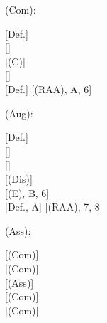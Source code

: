 \documentclass[a4paper,english,fleqn,11pt,final]{scrartcl}
\newcommand{\negg}{{\sim}}
\newcommand{\limp}{\multimap}
\newcommand{\timp}{\rightarrowtriangle}
\newcommand{\tens}{\otimes}
\newcommand{\Deriv}[1]{{\normalfont\textsf{#1}}}
\newcommand{\oland}{\owedge}
\theoremstyle{plain}
\theoremstyle{definition}
\begin{document}
{
\scriptsize



\begin{minipage}[t][][b]{.43\textwidth}
\Deriv{(Com)}:

\medskip

{
\setlength{\fitchprfwidth}{1.2in}
\fitchprf{
\pline[A ]{\varphi \tens \psi}
}
{
	\subproof{
	\pline[1 ]{\negg(\psi\tens\varphi)}
	}
	{
		\pline[2 ]{\negg\negg(\psi \limp \negg \varphi)}[Def.]\\
		\pline[3 ]{\psi \limp \negg \varphi}[]\\
		\pline[4 ]{\varphi \limp \negg \psi}[\Deriv{(C)}]\\
		\pline[5 ]{\negg\negg(\varphi\limp\negg\psi)}[]\\
		\pline[6 ]{\negg(\varphi\tens\psi)}[Def.]
	}
	\pline[\slider]{\psi \tens \varphi}[\Deriv{(RAA)}, A, 6]
}
}
\end{minipage}
\begin{minipage}[t][][b]{.49\textwidth}
\Deriv{(Aug)}:

\medskip

{
	\setlength{\fitchprfwidth}{1.6in}
\fitchprf{
\pline[A ]{\varphi\tens\psi}\\
\pline[B ]{\varphi \limp \vartheta}
}
{
 	\subproof{
		\pline[1 ]{\negg(\varphi \tens (\psi \oland \vartheta))}
	}
	{
		\pline[2 ]{\negg\negg(\varphi\limp \negg (\psi \oland \vartheta))}[Def.]\\
		\pline[3 ]{\varphi \limp \negg(\psi \oland \vartheta)}[]\\
		\pline[4 ]{\varphi \limp (\vartheta \timp \negg\psi )}[]\\
		\pline[6 ]{(\varphi \limp \vartheta) \timp (\varphi \limp \negg\psi)}[\Deriv{(Dis)}]\\
		\pline[7 ]{\varphi \limp\negg \psi}[\Deriv{(E)}, B, 6]\\
		\pline[8 ]{\negg(\varphi \limp \negg \psi)}[Def., A]
	}
	\pline[\slider]{\varphi \tens (\psi \oland \vartheta)}[\Deriv{(RAA)}, 7, 8]
}
}
\end{minipage}


\bigskip

\begin{minipage}[t][][b]{.43\textwidth}

\Deriv{(Ass)}:

\medskip

{
\setlength{\fitchprfwidth}{1.2in}
\fitchprf{
\pline[A ]{(\varphi\tens\psi)\tens\vartheta)}
}
{
	\pline[1 ]{\vartheta \tens (\varphi \tens\psi)}[\Deriv{(Com)}]\\
	\pline[2 ]{\vartheta \tens (\psi \tens \varphi)}[\Deriv{(Com)}]\\
	\pline[3 ]{(\vartheta \tens \psi) \tens \varphi}[\Deriv{(Ass)}]\\
	\pline[4 ]{\varphi \tens (\vartheta \tens \psi)}[\Deriv{(Com)}]\\
	\pline[\slider]{\varphi \tens (\psi \tens \vartheta)}[\Deriv{(Com)}]
}
}
\end{minipage}
\begin{minipage}[t][][b]{.46\textwidth}


\end{minipage}}
\end{document}
